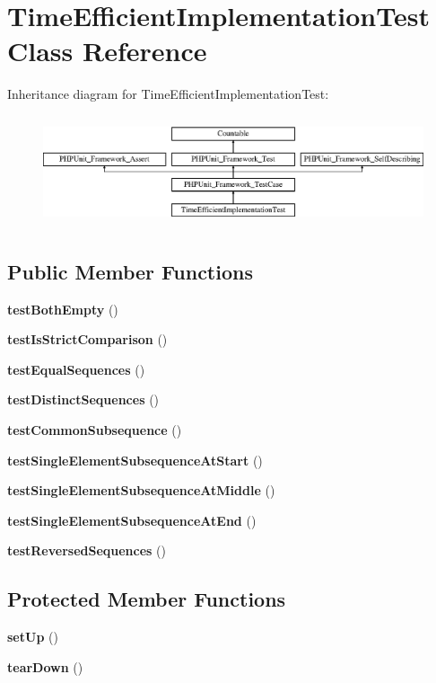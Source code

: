 \section{Time\+Efficient\+Implementation\+Test Class Reference}
\label{class_sebastian_bergmann_1_1_diff_1_1_l_c_s_1_1_time_efficient_implementation_test}
Inheritance diagram for Time\+Efficient\+Implementation\+Test\+:\begin{figure}[H]
\begin{center}
\leavevmode
\includegraphics[height=3.303835cm]{class_sebastian_bergmann_1_1_diff_1_1_l_c_s_1_1_time_efficient_implementation_test}
\end{center}
\end{figure}
\subsection*{Public Member Functions}
\begin{DoxyCompactItemize}
\item 
{\bf test\+Both\+Empty} ()
\item 
{\bf test\+Is\+Strict\+Comparison} ()
\item 
{\bf test\+Equal\+Sequences} ()
\item 
{\bf test\+Distinct\+Sequences} ()
\item 
{\bf test\+Common\+Subsequence} ()
\item 
{\bf test\+Single\+Element\+Subsequence\+At\+Start} ()
\item 
{\bf test\+Single\+Element\+Subsequence\+At\+Middle} ()
\item 
{\bf test\+Single\+Element\+Subsequence\+At\+End} ()
\item 
{\bf test\+Reversed\+Sequences} ()
\end{DoxyCompactItemize}
\subsection*{Protected Member Functions}
\begin{DoxyCompactItemize}
\item 
{\bf set\+Up} ()
\item 
{\bf tear\+Down} ()
\end{DoxyCompactItemize}
